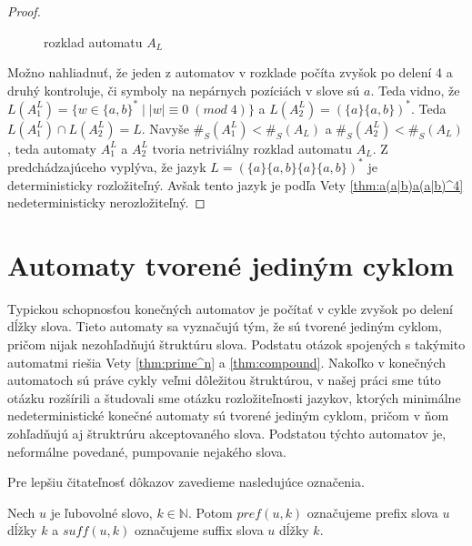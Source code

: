 \begin{proof}
\begin{figure}[H]
\caption{rozklad automatu $ A_L $}
\end{figure}

Možno nahliadnuť, že jeden z automatov v rozklade počíta zvyšok po delení 4 a druhý kontroluje, či symboly na nepárnych pozíciách v slove sú $ a $. Teda vidno, že $ L(A_1^L) = \lbrace w \in \lbrace a,b \rbrace^* \; | \; |w| \equiv 0 \; (mod \; 4) \rbrace $ a $ L(A_2^L) = (\lbrace a \rbrace \lbrace a,b \rbrace)^* $. Teda $ L(A_1^L) \cap L(A_2^L) = L $. Navyše $ \#_S(A_1^L) < \#_S(A_L) $ a $ \#_S(A_2^L) < \#_S(A_L) $, teda automaty $ A_1^L $ a $ A_2^L $ tvoria netriviálny rozklad automatu $ A_L $. Z predchádzajúceho vyplýva, že jazyk $ L = (\lbrace a \rbrace \lbrace a,b \rbrace \lbrace a \rbrace \lbrace a,b \rbrace)^* $ je deterministicky rozložiteľný. Avšak tento jazyk je podľa Vety \ref{thm:a(a|b)a(a|b)^4} nedeterministicky nerozložiteľný.
\end{proof}

\section{Automaty tvorené jediným cyklom}

Typickou schopnosťou konečných automatov je počítať v cykle zvyšok po delení dĺžky slova. Tieto automaty sa vyznačujú tým, že sú tvorené jediným cyklom, pričom nijak nezohľadňujú štruktúru slova. Podstatu otázok spojených s takýmito automatmi riešia Vety \ref{thm:prime^n} a \ref{thm:compound}. Nakoľko v konečných automatoch sú práve cykly veľmi dôležitou štruktúrou, v našej práci sme túto otázku rozšírili a študovali sme otázku rozložiteľnosti jazykov, ktorých minimálne nedeterministické konečné automaty sú tvorené jediným cyklom, pričom v ňom zohľadňujú aj štruktrúru akceptovaného slova. Podstatou týchto automatov je, neformálne povedané, pumpovanie nejakého slova.
\par
Pre lepšiu čitateľnosť dôkazov zavedieme nasledujúce označenia.

\begin{notation}
\normalfont
Nech $ u $ je ľubovolné slovo, $ k \in \mathbb{N} $. Potom $ pref(u,k) $ označujeme prefix slova $ u $ dĺžky $ k $ a $ suff(u,k) $ označujeme suffix slova $ u $ dĺžky $ k $.
\end{notation}

